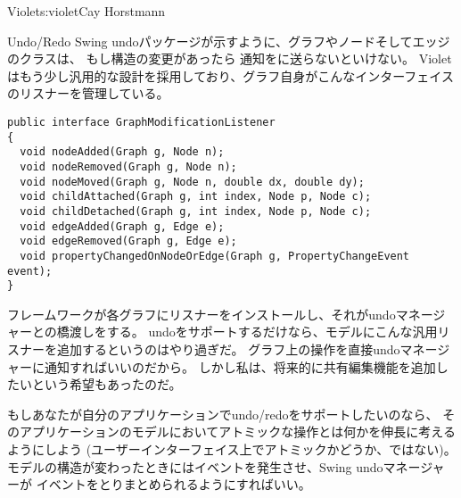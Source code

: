 \begin{aosachapter}{Violet}{s:violet}{Cay Horstmann}
\begin{aosasect1}{Undo/Redo}
Swing undoパッケージが示すように、グラフやノードそしてエッジのクラスは、
もし構造の変更があったら
通知をに送らないといけない。
Violetはもう少し汎用的な設計を採用しており、グラフ自身がこんなインターフェイスのリスナーを管理している。

\begin{verbatim}
public interface GraphModificationListener
{
  void nodeAdded(Graph g, Node n);
  void nodeRemoved(Graph g, Node n);
  void nodeMoved(Graph g, Node n, double dx, double dy);
  void childAttached(Graph g, int index, Node p, Node c);
  void childDetached(Graph g, int index, Node p, Node c);
  void edgeAdded(Graph g, Edge e);
  void edgeRemoved(Graph g, Edge e);
  void propertyChangedOnNodeOrEdge(Graph g, PropertyChangeEvent event);
}
\end{verbatim}

フレームワークが各グラフにリスナーをインストールし、それがundoマネージャーとの橋渡しをする。
undoをサポートするだけなら、モデルにこんな汎用リスナーを追加するというのはやり過ぎだ。
グラフ上の操作を直接undoマネージャーに通知すればいいのだから。
しかし私は、将来的に共有編集機能を追加したいという希望もあったのだ。

もしあなたが自分のアプリケーションでundo/redoをサポートしたいのなら、
そのアプリケーションのモデルにおいてアトミックな操作とは何かを伸長に考えるようにしよう
(ユーザーインターフェイス上でアトミックかどうか、ではない)。
モデルの構造が変わったときにはイベントを発生させ、Swing undoマネージャーが
イベントをとりまとめられるようにすればいい。

\end{aosasect1}


\end{aosachapter}
